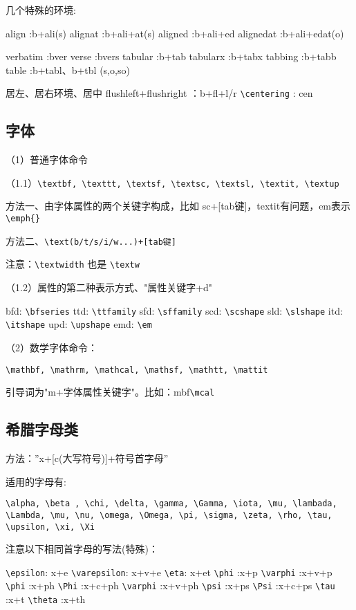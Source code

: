 几个特殊的环境:

align    :b+ali(s)
alignat   :b+ali+at(s)
aligned  :b+ali+ed
alignedat :b+ali+edat(o)
 
verbatim  :bver
verse    :bvers
tabular   :b+tab
tabularx  :b+tabx
tabbing  :b+tabb
table    :b+tabl、b+tbl (s,o,so)
 
居左、居右环境、居中
flushleft+flushright ：b+fl+l/r
\verb|\centering|         : cen
 
 
 
 \subsection{字体}
（1）普通字体命令

（1.1）\verb|\textbf, \texttt, \textsf, \textsc, \textsl, \textit, \textup|

   方法一、由字体属性的两个关键字构成，比如 sc+[tab键]，textit有问题，em表示\verb|\emph{}|
   
   方法二、\verb|\text(b/t/s/i/w...)+[tab键]|
   
   注意：\verb|\textwidth| 也是 \verb|\textw|

（1.2）属性的第二种表示方式、"属性关键字+d"

    bfd: \verb|\bfseries|
    ttd: \verb|\ttfamily|
    sfd: \verb|\sffamily|
    scd: \verb|\scshape|
    sld:  \verb|\slshape|
    itd:  \verb|\itshape|
    upd: \verb|\upshape|
    emd: \verb|\em|
 
（2）数学字体命令：
    
  \verb|\mathbf, \mathrm, \mathcal, \mathsf, \mathtt, \mattit|
  
    引导词为"m+字体属性关键字"。比如：mbf\verb|\mcal|
 

 
 \subsection{希腊字母类}
方法：”x+[c(大写符号)]+符号首字母”

适用的字母有:
\begin{verbatim}
\alpha, \beta , \chi, \delta, \gamma, \Gamma, \iota, \mu, \lambada,
\Lambda, \mu, \nu, \omega, \Omega, \pi, \sigma, \zeta, \rho, \tau,
\upsilon, \xi, \Xi
\end{verbatim}

注意以下相同首字母的写法(特殊)：

\verb|\epsilon|: x+e
\verb|\varepsilon|: x+v+e
\verb|\eta|: x+et
\verb|\phi| :x+p
\verb|\varphi| :x+v+p
\verb|\phi| :x+ph
\verb|\Phi| :x+c+ph
\verb|\varphi| :x+v+ph
\verb|\psi| :x+ps
\verb|\Psi| :x+c+ps
\verb|\tau| :x+t
\verb|\theta| :x+th
 
